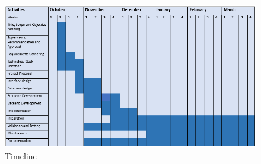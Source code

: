 \begin{figure}[htbp]
  \centering
  \includegraphics[width=6.4in]{ganttchart.PNG}
  \caption{Timeline}
  \label{fig:ganttchart}
\end{figure}



 



